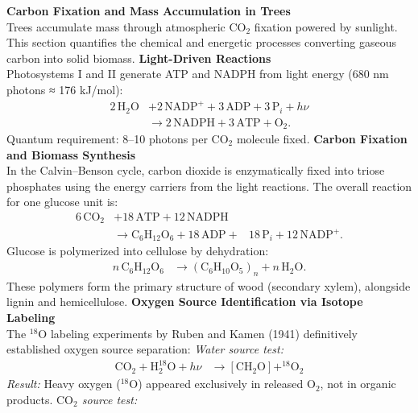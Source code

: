 \begin{technical}
{\Large\textbf{Carbon Fixation and Mass Accumulation in Trees}}\\
Trees accumulate mass through atmospheric $\mathrm{CO}_2$ fixation powered by sunlight. This section quantifies the chemical and energetic processes converting gaseous carbon into solid biomass.
\noindent\textbf{Light-Driven Reactions}\\
Photosystems I and II generate ATP and NADPH from light energy (680 nm photons ≈ 176 kJ/mol):
\begin{align}
2\,\mathrm{H}_2\mathrm{O} 
&+ 2\,\mathrm{NADP}^+ 
+ 3\,\mathrm{ADP} 
+ 3\,\mathrm{P}_i 
+ h\nu \nonumber \\
&\rightarrow 2\,\mathrm{NADPH} 
+ 3\,\mathrm{ATP} 
+ \mathrm{O}_2.
\end{align}
Quantum requirement: 8–10 photons per $\mathrm{CO}_2$ molecule fixed.
\noindent\textbf{Carbon Fixation and Biomass Synthesis}\\
In the Calvin–Benson cycle, carbon dioxide is enzymatically fixed into triose phosphates using the energy carriers from the light reactions. The overall reaction for one glucose unit is:
\begin{align}
6\,\mathrm{CO}_2 
&+ 18\,\mathrm{ATP} 
+ 12\,\mathrm{NADPH} \nonumber \\
&\rightarrow \mathrm{C}_6\mathrm{H}_{12}\mathrm{O}_6 
+ 18\,\mathrm{ADP} + 
&18\,\mathrm{P}_i 
+ 12\,\mathrm{NADP}^+.
\end{align}
Glucose is polymerized into cellulose by dehydration:
\begin{align}
n\,\mathrm{C}_6\mathrm{H}_{12}\mathrm{O}_6 
&\rightarrow (\mathrm{C}_6\mathrm{H}_{10}\mathrm{O}_5)_n 
+ n\,\mathrm{H}_2\mathrm{O}.
\end{align}
These polymers form the primary structure of wood (secondary xylem), alongside lignin and hemicellulose.
\noindent\textbf{Oxygen Source Identification via Isotope Labeling}\\
The $^{18}\mathrm{O}$ labeling experiments by Ruben and Kamen (1941) definitively established oxygen source separation:
\noindent\textit{Water source test:}
\begin{align}
\mathrm{CO}_2 + \mathrm{H}_2^{18}\mathrm{O} + h\nu 
&\rightarrow [\mathrm{CH}_2\mathrm{O}] + ^{18}\mathrm{O}_2
\end{align}
\textit{Result:} Heavy oxygen ($^{18}\mathrm{O}$) appeared exclusively in released $\mathrm{O}_2$, not in organic products.
\noindent\textit{$\mathrm{CO}_2$ source test:}

\end{technical}
